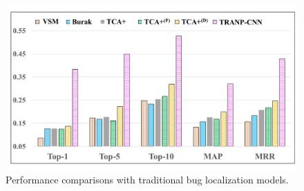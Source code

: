 \begin{figure}[hbt]
\centering
\includegraphics[width = 0.9\columnwidth]{pic/results3_avg.pdf}
\caption{Performance comparisons with traditional bug localization models.}
\label{fig:results3}
\end{figure}

